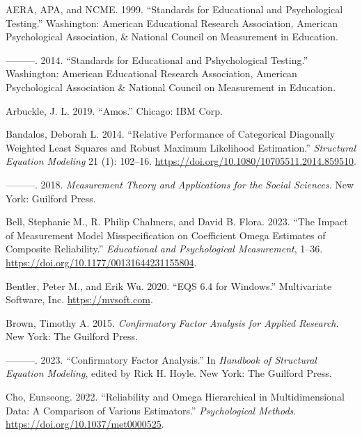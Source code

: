 \documentclass[
  a4paper,
]{article}
\newlength{\cslhangindent}
\newenvironment{CSLReferences}[2] %
 {\begin{list}{}{%
  \setlength{\itemindent}{0pt}
  \setlength{\leftmargin}{0pt}
  \setlength{\parsep}{0pt}
  \ifodd #1
   \setlength{\leftmargin}{\cslhangindent}
   \setlength{\itemindent}{-1\cslhangindent}
  \fi
  \setlength{\itemsep}{#2\baselineskip}}}
 {\end{list}}
\begin{document}
\label{refs}
\begin{CSLReferences}{1}{0}
AERA, APA, and NCME. 1999. {``Standards for {Educational} and
{Psychological Testing}.''} Washington: American Educational Research
Association, American Psychological Association, \& National Council on
Measurement in Education.

---------. 2014. {``Standards for {Educational} and {Pshychological
Testing}.''} Washington: American Educational Research Association,
American Psychological Association \& National Council on Measurement in
Education.

Arbuckle, J. L. 2019. {``Amos.''} Chicago: IBM Corp.

Bandalos, Deborah L. 2014. {``Relative {Performance} of {Categorical
Diagonally Weighted Least Squares} and {Robust Maximum Likelihood
Estimation}.''} \emph{Structural Equation Modeling} 21 (1): 102--16.
\url{https://doi.org/10.1080/10705511.2014.859510}.

---------. 2018. \emph{Measurement Theory and Applications for the
Social Sciences}. New York: Guilford Press.

Bell, Stephanie M., R. Philip Chalmers, and David B. Flora. 2023. {``The
{Impact} of {Measurement Model Misspecification} on {Coefficient Omega
Estimates} of {Composite Reliability}.''} \emph{Educational and
Psychological Measurement}, 1--36.
\url{https://doi.org/10.1177/00131644231155804}.

Bentler, Peter M., and Erik Wu. 2020. {``{EQS} 6.4 for {Windows}.''}
Multivariate Software, Inc. \url{https://mvsoft.com}.

Brown, Timothy A. 2015. \emph{Confirmatory {Factor Analysis} for
{Applied Research}}. New York: The Guilford Press.

---------. 2023. {``Confirmatory {Factor Analysis}.''} In \emph{Handbook
of {Structural Equation Modeling}}, edited by Rick H. Hoyle. New York:
The Guilford Press.

Cho, Eunseong. 2022. {``Reliability and {Omega Hierarchical} in
{Multidimensional Data}: {A Comparison} of {Various Estimators}.''}
\emph{Psychological Methods}. \url{https://doi.org/10.1037/met0000525}.


\end{CSLReferences}
\end{document}
